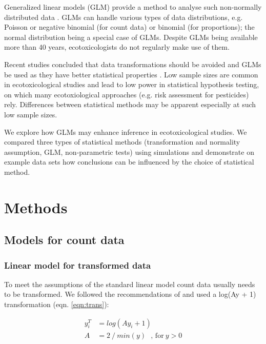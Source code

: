 \documentclass{scrartcl}
\begin{document}
Generalized linear models (GLM) provide a method to analyse such non-normally distributed data \citep{nelder_generalized_1972}.
GLMs can handle various types of data distributions, e.g. Poisson or negative binomial (for count data) or binomial (for proportions); the normal distribution being a special case of GLMs.
Despite GLMs being available more than 40 years, ecotoxicologists do not regularly make use of them.

Recent studies concluded that data transformations should be avoided and GLMs be used as they have better statistical properties \citep{ohara_not_2010, warton_arcsine_2011}. 
Low sample sizes are common in ecotoxicological studies \citep{sanderson_pesticide_2002, szocs_analysing_2015} and lead to low power in statistical hypothesis testing, on which many ecotoxiological approaches (e.g. risk assessment for pesticides) rely. 
Differences between statistical methods may be apparent especially at such low sample sizes.

We explore how GLMs may enhance inference in ecotoxicological studies. 
We compared three types of statistical methods (transformation and normality assumption, GLM, non-parametric tests) using simulations and demonstrate on example data sets how conclusions can be influenced by the choice of statistical method.



\section{Methods}
\label{sec:methods}
\subsection{Models for count data}
\subsubsection{Linear model for transformed data}
To meet the assumptions of the standard linear model count data usually needs to be transformed. 
We followed the recommendations of \citet{van_den_brink_impact_2000} and used a log(Ay + 1) transformation (eqn. \ref{eqn:trans}):

\begin{align}
  y^T_i & = log(Ay_i + 1) \label{eqn:trans} \\
  A & = 2~/~min(y)~~~\text{, for}~ y > 0 \nonumber
\end{align}
\end{document}
